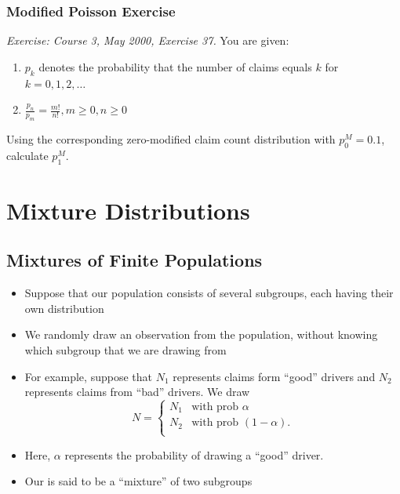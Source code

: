 \documentclass[]{book}
\theoremstyle{definition}
\theoremstyle{definition}
\theoremstyle{definition}
\theoremstyle{remark}
\begin{document}
\subsubsection{Modified Poisson
Exercise}\label{modified-poisson-exercise}

\emph{Exercise: Course 3, May 2000, Exercise 37.} You are given:

\begin{enumerate}
\def\labelenumi{\arabic{enumi}.}
\item
  \(p_k\) denotes the probability that the number of claims equals \(k\)
  for \(k=0,1,2,\ldots\)
\item
  \(\frac{p_n}{p_m}=\frac{m!}{n!}, m\ge 0, n\ge 0\)
\end{enumerate}

Using the corresponding zero-modified claim count distribution with
\(p_0^M=0.1\), calculate \(p_1^M\).

\section{Mixture Distributions}\label{mixture-distributions}

\subsection{Mixtures of Finite
Populations}\label{mixtures-of-finite-populations}

\begin{itemize}
\item
  Suppose that our population consists of several subgroups, each having
  their own distribution
\item
  We randomly draw an observation from the population, without knowing
  which subgroup that we are drawing from
\item
  For example, suppose that \(N_1\) represents claims form ``good''
  drivers and \(N_2\) represents claims from ``bad'' drivers. We draw
  \[N =
  \begin{cases}
  N_1  &  \text{with prob~}\alpha\\
  N_2  &   \text{with prob~}(1-\alpha) .\\
  \end{cases}\]
\item
  Here, \(\alpha\) represents the probability of drawing a ``good''
  driver.
\item
  Our is said to be a ``mixture'' of two subgroups
\end{itemize}
\end{document}
